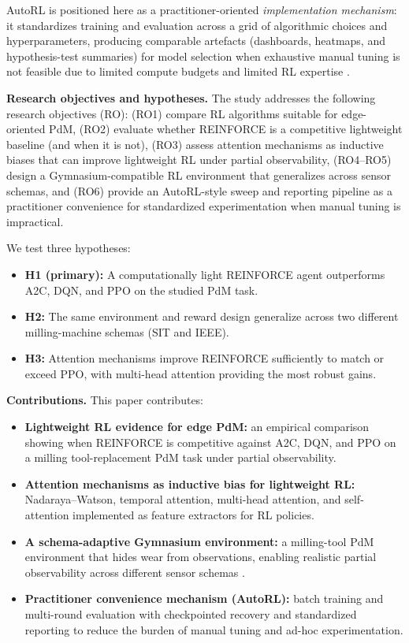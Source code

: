 \documentclass[sn-basic]{sn-jnl} %
\begin{document}
AutoRL is positioned here as a practitioner-oriented \emph{implementation mechanism}: it standardizes training and evaluation across a grid of algorithmic choices and hyperparameters, producing comparable artefacts (dashboards, heatmaps, and hypothesis-test summaries) for model selection when exhaustive manual tuning is not feasible due to limited compute budgets and limited RL expertise \cite{Schwartz2020, Strubell2019, Faust2019, Mussi2022}.

\textbf{Research objectives and hypotheses.}
The study addresses the following research objectives (RO): (RO1) compare RL algorithms suitable for edge-oriented PdM, (RO2) evaluate whether \textsc{REINFORCE} is a competitive lightweight baseline (and when it is not), (RO3) assess attention mechanisms as inductive biases that can improve lightweight RL under partial observability, (RO4--RO5) design a Gymnasium-compatible RL environment that generalizes across sensor schemas, and (RO6) provide an AutoRL-style sweep and reporting pipeline as a practitioner convenience for standardized experimentation when manual tuning is impractical.

We test three hypotheses:
\begin{itemize}
        \item \textbf{H1 (primary):} A computationally light REINFORCE agent outperforms A2C, DQN, and PPO on the studied PdM task.
        \item \textbf{H2:} The same environment and reward design generalize across two different milling-machine schemas (SIT and IEEE).
        \item \textbf{H3:} Attention mechanisms improve REINFORCE sufficiently to match or exceed PPO, with multi-head attention providing the most robust gains.
\end{itemize}

\textbf{Contributions.}
This paper contributes:
\begin{itemize}
        \item \textbf{Lightweight RL evidence for edge PdM:} an empirical comparison showing when \textsc{REINFORCE} is competitive against \textsc{A2C}, \textsc{DQN}, and \textsc{PPO} on a milling tool-replacement PdM task under partial observability.
        \item \textbf{Attention mechanisms as inductive bias for lightweight RL:} Nadaraya--Watson, temporal attention, multi-head attention, and self-attention implemented as feature extractors for RL policies.
        \item \textbf{A schema-adaptive Gymnasium environment:} a milling-tool PdM environment that hides wear from observations, enabling realistic partial observability across different sensor schemas \cite{Foundation2023}.
        \item \textbf{Practitioner convenience mechanism (AutoRL):} batch training and multi-round evaluation with checkpointed recovery and standardized reporting to reduce the burden of manual tuning and ad-hoc experimentation.
\end{itemize}
\end{document}
